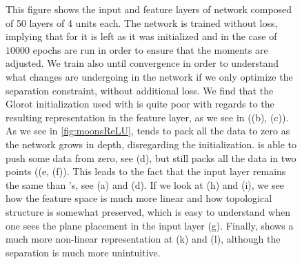 \begin{figure}
  \caption{This figure shows the input and feature layers of network composed of 50 layers of 4 units each. The network is trained without loss, implying that for \ReLU it is left as it was initialized and in the case of \ReLUBN $10000$ epochs are run in order to ensure that the moments are adjusted. We train also \SepLayer until convergence in order to understand what changes are undergoing in the network if we only optimize the separation constraint, without additional loss. We find that the Glorot initialization used with \ReLU is quite poor with regards to the resulting representation in the feature layer, as we see in ((b), (c)). As we see in \ref{fig:moonsReLU}, \ReLU tends to pack all the data to zero as the network grows in depth, disregarding the initialization. \ReLUBN is able to push some data from zero, see (d), but still packs all the data in two points ((e, (f)). This leads to the fact that the input layer remains the same than \ReLU's, see (a) and (d). If we look at \SepLayer (h) and (i), we see how the feature space is much more linear and how topological structure is somewhat preserved, which is easy to understand when one sees the plane placement in the input layer (g). Finally, \SepPointUnit shows a much more non-linear representation at (k) and (l), although the separation is much more unintuitive.} 
  \label{fig:init} 
\end{figure}


